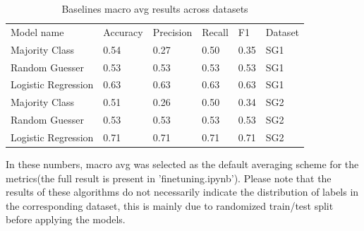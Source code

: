 \documentclass[11pt,a4paper]{article}
\begin{document}
\begin{table}[h]
\caption{Baselines macro avg results across datasets}
\small
\centering
\begin{tabular}{llllll}
{\color[HTML]{000000} Model name} & {\color[HTML]{000000} Accuracy} & {\color[HTML]{000000} Precision} & {\color[HTML]{000000} Recall} & F1   & Dataset \\
Majority Class                                           & 0.54                                                   & 0.27                                                    & 0.50                                                 & 0.35 & SG1     \\
Random Guesser                                           & 0.53                                                   & 0.53                                                    & 0.53                                                 & 0.53 & SG1     \\
Logistic Regression                                      & 0.63                                                   & 0.63                                                    & 0.63                                                 & 0.63 & SG1     \\
Majority Class                                           & 0.51                                                   & 0.26                                                    & 0.50                                                 & 0.34 & SG2     \\
Random Guesser                                           & 0.53                                                   & 0.53                                                    & 0.53                                                 & 0.53 & SG2     \\
Logistic Regression                                      & 0.71                                                   & 0.71                                                    & 0.71                                                 & 0.71 & SG2    
\end{tabular}
\end{table}
In these numbers, macro avg was selected as the default averaging scheme for the metrics(the full result is present in {'finetuning.ipynb'}). Please note that the results of these algorithms do not necessarily indicate the distribution of labels in the corresponding dataset, this is mainly due to randomized train/test split before applying the models.
\end{document}
